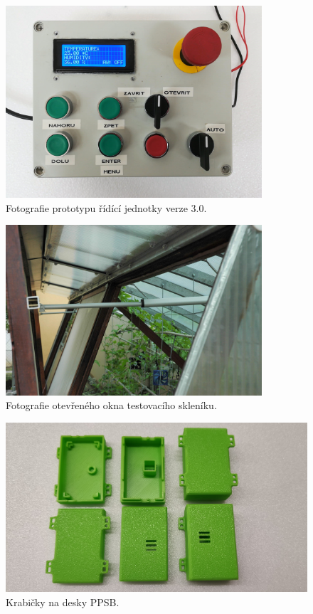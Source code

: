 \begin{figure}[htbp]
    \centering
    \includegraphics[width=0.85\textwidth]{img/PHOTOS/ControlUnitOLD.jpg}
    \caption{Fotografie prototypu řídící jednotky verze 3.0.}
    \label{fig:PPCU_v3_0}
\end{figure}

\begin{figure}[htbp]
    \centering
    \includegraphics[width=0.85\textwidth]{img/PHOTOS/VS_1.jpg}
    \caption{Fotografie otevřeného okna testovacího skleníku.}
    \label{fig:OPEN_WINDOW}
\end{figure}

\begin{figure}[htbp]
    \centering
    \includegraphics[width=\textwidth]{img/PHOTOS/PPSB-T_cases.jpg}
    \caption{Krabičky na desky PPSB.}
    \label{fig:PPSB-T_cases}
\end{figure}

\newpage